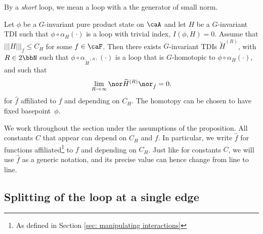 By a \emph{short} loop, we mean a loop with a the generator of small norm. 
\begin{proposition}\label{prop: loop contractible to small loop}
	Let $\phi$ be a $G$-invariant pure product state on $\caA$ and let $H$ be a $G$-invariant TDI such that $\phi\circ \alpha_H(\cdot)$ is a loop with trivial index, $I(\phi,H)= 0$. Assume that $|||H |||_f \leq C_H$ for some $f\in\caF$. Then there exists $G$-invariant TDIs $\widetilde H^{(R)}$, with $R\in 2\bbN$ such that
	$\phi\circ\alpha_{\widetilde H^{(R)}}(\cdot)$ is a loop that is $G$-homotopic to $\phi\circ\alpha_{H}(\cdot)$, and such that
	$$
	\lim_{R\to\infty} \nor \widetilde H^{(R)}\nor_{\hat{f}} =0.
	$$  
	for $\hat{f}$ affiliated to $f$ and depending on $C_H$. The homotopy can be chosen to have fixed basepoint~$\phi$. 
\end{proposition} 
We work throughout the section under the assumptions of the proposition. All constants $C$ that appear can depend on $C_H$ and $f$. 
In particular, we write $\hat{f}$ for functions affiliated\footnote{As defined in Section \ref{sec: manipulating interactions}} to $f$ and depending on $C_H$.
Just like for constants $C$, we will use  $\hat{f}$ as a generic notation, and its precise value can hence change from line to line.   


\subsection{Splitting of the loop at a single edge}\label{sec: splitting at single edge}

